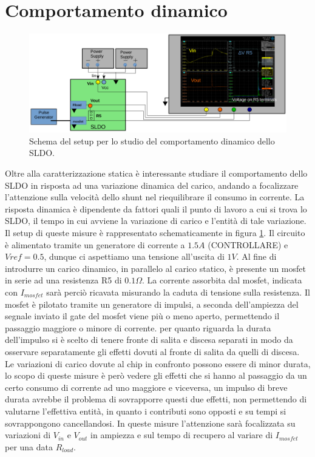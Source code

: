 \section{Comportamento dinamico}

\begin{figure}
\centering
\includegraphics[scale=.3]{Immagini/SetupScheme}
\caption{Schema del setup per lo studio del comportamento dinamico dello SLDO.}
\label{Setupscheme}
\end{figure}

Oltre alla caratterizzazione statica è interessante studiare il comportamento dello SLDO in risposta ad una variazione dinamica del carico, andando a focalizzare l'attenzione sulla velocità dello shunt nel riequilibrare il consumo in corrente. La risposta dinamica è dipendente da fattori quali il punto di lavoro a cui si trova lo SLDO, il tempo in cui avviene la variazione di carico e l'entità di tale variazione.
Il setup di queste misure è rappresentato schematicamente in figura \ref{Setupscheme}. Il circuito è alimentato tramite un generatore di corrente a $1.5A$ (CONTROLLARE) e $Vref=0.5 $, dunque ci aspettiamo una tensione all'uscita di $1V$. Al fine di introdurre un carico dinamico, in parallelo al carico statico, è presente un mosfet in serie ad una resistenza R5 di $0.1 \Omega$.
La corrente assorbita dal mosfet, indicata con $I_{mosfet}$ sarà perciò ricavata misurando la caduta di tensione sulla resistenza. Il mosfet è pilotato tramite un generatore di impulsi, a seconda dell'ampiezza del segnale inviato il gate del mosfet viene più o meno aperto, permettendo il passaggio maggiore o minore di corrente.
per quanto riguarda la durata dell'impulso si è scelto di tenere fronte di salita e discesa separati in modo da osservare separatamente gli effetti dovuti al fronte di salita da quelli di discesa. 
Le variazioni di carico dovute al chip in confronto possono essere di minor durata, lo scopo di queste misure è però vedere gli effetti che si hanno al passaggio da un certo consumo di corrente ad uno maggiore e viceversa, un impulso di breve durata avrebbe il problema di sovrapporre questi due effetti, non permettendo di valutarne l'effettiva entità, in quanto i contributi sono opposti e su tempi si sovrappongono cancellandosi.
In queste misure l'attenzione sarà focalizzata su variazioni di $V_{in}$ e $V_{out}$ in ampiezza e sul tempo di recupero al variare di $I_{mosfet}$ per una data $R_{load}$.


